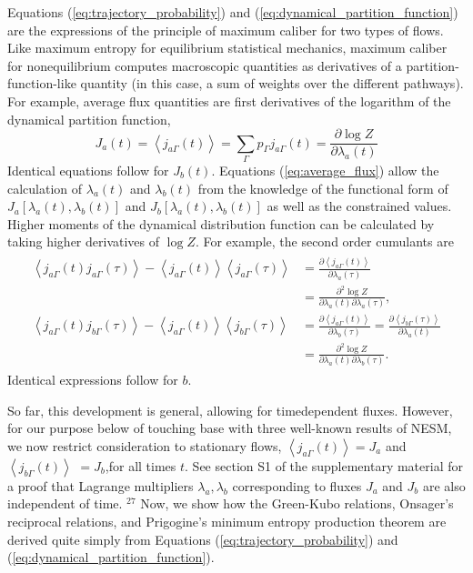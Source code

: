 \documentclass[aps,pra,twocolumn]{revtex4-1}
\begin{document}
Equations (\ref{eq:trajectory_probability}) and (\ref{eq:dynamical_partition_function}) are the expressions of the principle of maximum caliber for two types of flows. Like maximum entropy for equilibrium statistical mechanics, maximum caliber for nonequilibrium computes macroscopic quantities as derivatives of a partition-function-like quantity (in this case, a sum of weights over the different pathways). For example, average flux quantities are first derivatives of the logarithm of the dynamical partition function,
\begin{equation}
J_a(t)=\left\langle j_{a \Gamma}(t)\right\rangle=\sum_{\Gamma} p_{\Gamma} j_{a \Gamma}(t)=\frac{\partial \log Z}{\partial \lambda_a(t)} \label{eq:average_flux}
\end{equation}
Identical equations follow for $J_b(t)$. Equations (\ref{eq:average_flux}) allow the calculation of $\lambda_a(t)$ and $\lambda_b(t)$ from the knowledge of the functional form of $J_a\left[\lambda_a(t), \lambda_b(t)\right]$ and $J_b\left[\lambda_a(t), \lambda_b(t)\right]$ as well as the constrained values. Higher moments of the dynamical distribution function can be calculated by taking higher derivatives of $\log Z$. For example, the second order cumulants are
\begin{eqnarray}
\begin{aligned}
\left\langle j_{a \Gamma}(t) j_{a \Gamma}(\tau)\right\rangle-\left\langle j_{a \Gamma}(t)\right\rangle\left\langle j_{a \Gamma}(\tau)\right\rangle & =\frac{\partial\left\langle j_{a \Gamma}(t)\right\rangle}{\partial \lambda_a(\tau)} \nonumber \\
& =\frac{\partial^2 \log Z}{\partial \lambda_a(t) \partial \lambda_a(\tau)}, \nonumber \\
\left\langle j_{a \Gamma}(t) j_{b \Gamma}(\tau)\right\rangle-\left\langle j_{a \Gamma}(t)\right\rangle\left\langle j_{b \Gamma}(\tau)\right\rangle & =\frac{\partial\left\langle j_{a \Gamma}(t)\right\rangle}{\partial \lambda_b(\tau)}=\frac{\partial\left\langle j_{b \Gamma}(\tau)\right\rangle}{\partial \lambda_a(t)} \nonumber \\
& =\frac{\partial^2 \log Z}{\partial \lambda_a(t) \partial \lambda_b(\tau)} . \nonumber
\end{aligned}
\end{eqnarray}
Identical expressions follow for $b$.

So far, this development is general, allowing for timedependent fluxes. However, for our purpose below of touching base with three well-known results of NESM, we now restrict consideration to stationary flows, $\left\langle j_{a \Gamma}(t)\right\rangle=J_a$ and $\left\langle j_{b \Gamma}(t)\right\rangle$ $=J_b$,for all times $t$. See section S1 of the supplementary material for a proof that Lagrange multipliers $\lambda_a, \lambda_b$ corresponding to fluxes $J_a$ and $J_b$ are also independent of time. ${ }^{27}$ Now, we show how the Green-Kubo relations, Onsager's reciprocal relations, and Prigogine's minimum entropy production theorem are derived quite simply from Equations (\ref{eq:trajectory_probability}) and (\ref{eq:dynamical_partition_function}).
\end{document}
